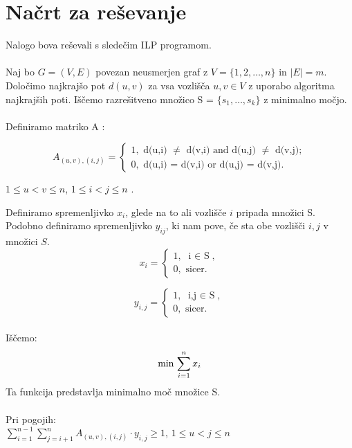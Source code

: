 \documentclass[a4paper]{report}
\begin{document}
\section{Načrt za reševanje}
Nalogo bova reševali s sledečim ILP programom.\\\\
Naj bo $G = ( V, E )$ povezan neusmerjen graf z $V = \{ 1,2, \dots, n \} $ in  $\mid E\mid=m$. Določimo najkrajšo pot $d(u,v)$  za vsa vozlišča $u,v \in V $ z uporabo algoritma najkrajših poti. Iščemo razrešitveno množico S = $\{s_1, \dots, s_k \}$ z minimalno močjo. \\\\
Definiramo matriko A :\\
\begin{center}
\[ A_{(u,v),(i,j)}  =  \left \{ \begin{array}{l}
1,  \mbox{ d(u,i) $\neq$ d(v,i) and d(u,j) $\neq$ d(v,j)}; \\
0, \mbox{ d(u,i) = d(v,i) or d(u,j) = d(v,j)}. \end{array} \right. 
\]

 $1 \le u < v \le n$, $1 \le i < j \le n $ .  \\ 
\end{center}
\pagebreak
Definiramo spremenljivko $x_i$, glede na to ali vozlišče $i$ pripada množici S. Podobno definiramo spremenljivko $y_{ij}$, ki nam pove, če sta obe vozlišči $i,j$ v množici $S$.\\

\[  x_i = \left \{ \begin{array}{l}
1, \mbox{ i $\in$ S}, \\
0, \mbox{ sicer}. \end{array} \right
.\] 

\[  y_{i,j} = \left \{ \begin{array}{l}
1, \mbox{ i,j $\in$ S}, \\
0, \mbox{ sicer}. \end{array} \right
.\]\\
Iščemo: 
\begin{displaymath}
\text{min } {\large  \sum_{i=1}^{n} x_i }
\end{displaymath} 
Ta funkcija predstavlja minimalno moč množice S. \\ 
\\
Pri pogojih:\\


$\displaystyle \sum_{i=1}^{n-1}\sum_{j=i+1}^{n} A_{(u,v),(i,j)} \cdot y_{i,j}\ge 1 $,      $1\le u < j \le n$ \\
\end{document}
